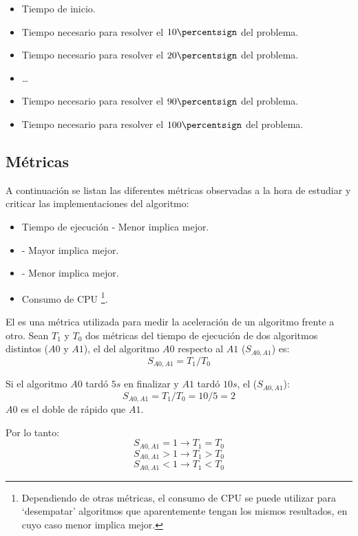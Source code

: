 \begin{itemize}[itemsep=0.25px]
    \item Tiempo de inicio.
    \item Tiempo necesario para resolver el $10\percentsign$ del problema.
    \item Tiempo necesario para resolver el $20\percentsign$ del problema.
    \item \dots
    \item Tiempo necesario para resolver el $90\percentsign$ del problema.
    \item Tiempo necesario para resolver el $100\percentsign$ del problema.
\end{itemize}

\pagebreak
\subsection{Métricas}

A continuación se listan las diferentes métricas observadas a la hora
de estudiar y criticar las implementaciones del algoritmo:
\begin{itemize}[itemsep=0.25px]
    \item Tiempo de ejecución - Menor implica mejor.
    \item {} - Mayor implica mejor.
    \item {} - Menor implica mejor.
    \item Consumo de CPU \footnote{
        Dependiendo de otras métricas, el consumo de CPU se
        puede utilizar para `desempatar' algoritmos que
        aparentemente tengan los mismos resultados,
        en cuyo caso menor implica mejor.
    }.
\end{itemize}

El  es una métrica utilizada para medir
la aceleración de un algoritmo frente a otro.
Sean $T_1$ y $T_0$ dos métricas del tiempo de ejecución
de dos algoritmos distintos ($A0$ y $A1$),
el  del algoritmo $A0$ respecto al $A1$ ($S_{A0,A1}$) es:
$$
    S_{A0,A1} = T_1 / T_0
$$

\begin{examplebox}
    Si el algoritmo $A0$ tardó $5s$ en finalizar y
    $A1$ tardó $10s$, el  ($S_{A0,A1}$):
    $$
        S_{A0,A1} = T_1 / T_0 = 10 / 5 = 2
    $$
    $A0$ es el doble de rápido que $A1$.
\end{examplebox}

Por lo tanto:
$$ S_{A0,A1} = 1 \rightarrow T_1 = T_0 $$ 
$$ S_{A0,A1} > 1 \rightarrow T_1 > T_0 $$ 
$$ S_{A0,A1} < 1 \rightarrow T_1 < T_0 $$

